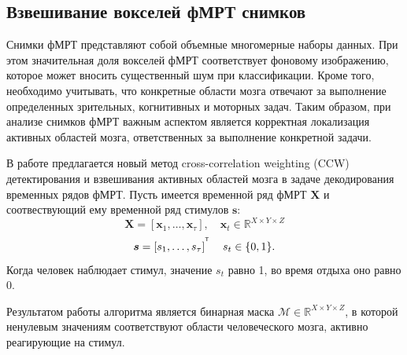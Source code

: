 \documentclass[a4paper, 12pt]{extarticle}
\begin{document}
\subsection{Взвешивание вокселей фМРТ снимков}
Снимки фМРТ представляют собой объемные многомерные наборы данных. 
При этом значительная доля вокселей фМРТ соответствует фоновому изображению, которое может вносить существенный шум при классификации. 
Кроме того, необходимо учитывать, что конкретные области мозга отвечают за выполнение определенных зрительных, когнитивных и моторных задач. 
Таким образом, при анализе снимков фМРТ важным аспектом является корректная локализация активных областей мозга, ответственных за выполнение конкретной задачи.

В работе предлагается новый метод cross-correlation weighting (CCW) детектирования и взвешивания активных областей мозга в задаче декодирования временных рядов фМРТ. 
Пусть имеется временной ряд фМРТ $\bm{X}$ и соотвествующий ему временной ряд стимулов $\bm{s}$:
\begin{equation*}
	\bm{X} = \left[\bm{x}_1, \dots, \bm{x}_{\tau}\right],\quad \bm{x}_{t} \in \mathbb{R}^{X \times Y \times Z}
\end{equation*}
\begin{equation*}
	\bm{s} = \left[s_1, \dots, s_{\tau}\right]^{^{\mathsf{T}}}\quad s_t \in \{0, 1\}.
\end{equation*}
Когда человек наблюдает стимул, значение $s_t$ равно 1, во время отдыха оно равно 0. 

Результатом работы алгоритма является бинарная маска $\mathcal{M} \in  \mathbb{R}^{X \times Y \times Z}$, в которой ненулевым значениям соответствуют области человеческого мозга, активно реагирующие на стимул.
\end{document}
